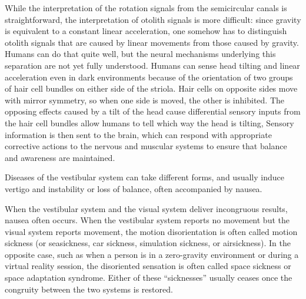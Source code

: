 \documentclass[]{book}
\begin{document}
While the interpretation of the rotation signals from the semicircular canals is straightforward, the interpretation of otolith signals is more difficult: since gravity is equivalent to a constant linear acceleration, one somehow has to distinguish otolith signals that are caused by linear movements from those caused by gravity. Humans can do that quite well, but the neural mechanisms underlying this separation are not yet fully understood. Humans can sense head tilting and linear acceleration even in dark environments because of the orientation of two groups of hair cell bundles on either side of the striola. Hair cells on opposite sides move with mirror symmetry, so when one side is moved, the other is inhibited. The opposing effects caused by a tilt of the head cause differential sensory inputs from the hair cell bundles allow humans to tell which way the head is tilting, Sensory information is then sent to the brain, which can respond with appropriate corrective actions to the nervous and muscular systems to ensure that balance and awareness are maintained.

Diseases of the vestibular system can take different forms, and usually induce vertigo and instability or loss of balance, often accompanied by nausea.

When the vestibular system and the visual system deliver incongruous results, nausea often occurs. When the vestibular system reports no movement but the visual system reports movement, the motion disorientation is often called motion sickness (or seasickness, car sickness, simulation sickness, or airsickness). In the opposite case, such as when a person is in a zero-gravity environment or during a virtual reality session, the disoriented sensation is often called space sickness or space adaptation syndrome. Either of these ``sicknesses'' usually ceases once the congruity between the two systems is restored.
\end{document}
